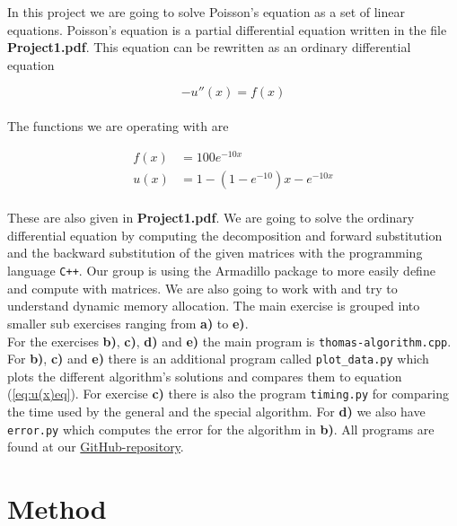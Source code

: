 \documentclass{article}
\begin{document}
In this project we are going to solve Poisson's equation as a set of linear equations. Poisson's equation is a partial differential equation written in the file \textbf{Project1.pdf}. This equation can be rewritten as an ordinary differential equation

\begin{equation}
  - u''(x) = f(x)   \label{eq:u(x)diffeq}
\end{equation} \\

The functions we are operating with are

\begin{align}
  f(x) &= 100 e ^{-10 x}    \label{eq:f(x)eq} \\
  u(x) &= 1 - (1- e ^{-10}) x - e ^{- 10 x} \label{eq:u(x)eq}
\end{align} \\

These are also given in \textbf{Project1.pdf}. We are going to solve the ordinary differential equation by computing the decomposition and forward substitution and the backward substitution of the given matrices with the programming language \texttt{C++}. Our group is using the Armadillo package to more easily define and compute with matrices. We are also going to work with and try to understand dynamic memory allocation. The main exercise is grouped into smaller sub exercises ranging from \textbf{a)} to \textbf{e)}. \\

For the exercises \textbf{b)}, \textbf{c)}, \textbf{d)} and \textbf{e)} the main program is \texttt{thomas-algorithm.cpp}. For \textbf{b)}, \textbf{c)} and \textbf{e)} there is an additional program called \texttt{plot\_data.py} which plots the different algorithm's solutions and compares them to equation (\ref{eq:u(x)eq}). For exercise \textbf{c)} there is also the program \texttt{timing.py} for comparing the time used by the general and the special algorithm. For \textbf{d)} we also have \texttt{error.py} which computes the error for the algorithm in \textbf{b)}.
All programs are found at our \href{https://github.com/Erikbgram/Fys3150}{GitHub-repository}. \\


\vspace{1cm}

\section{Method} \label{sec:Method}
\end{document}
